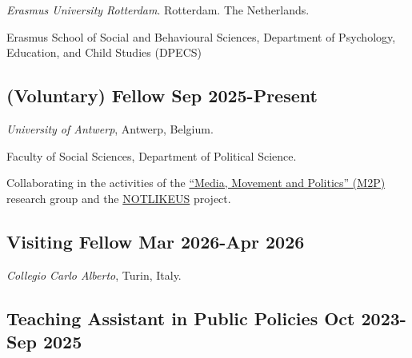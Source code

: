 \documentclass[10pt,]{article}
\providecommand{\tightlist}{%
  \setlength{\itemsep}{0pt}\setlength{\parskip}{0pt}}
\renewenvironment{itemize}{
  \begin{list}{}{
    \setlength{\leftmargin}{1.5em}
  }
}{
  \end{list}
}
\begin{document}
\begin{itemize}
\item
  \emph{Erasmus University Rotterdam}. Rotterdam. The Netherlands.

  \begin{itemize}
  \tightlist
  \item
    Erasmus School of Social and Behavioural Sciences, Department of
    Psychology, Education, and Child Studies (DPECS)
  \end{itemize}
\end{itemize}

\subsection{\texorpdfstring{(Voluntary) Fellow \hfill Sep
2025-Present}{(Voluntary) Fellow Sep 2025-Present}}\label{voluntary-fellow-sep-2025-present}

\begin{itemize}
\tightlist
\item
  \emph{University of Antwerp}, Antwerp, Belgium.
\item
  Faculty of Social Sciences, Department of Political Science.
\item
  Collaborating in the activities of the
  \href{https://www.uantwerpen.be/en/research-groups/m2p/}{``Media,
  Movement and Politics'' (M2P)} research group and the
  \href{https://notlikeus.be/}{NOTLIKEUS} project.
\end{itemize}

\subsection{\texorpdfstring{Visiting Fellow \hfill Mar 2026-Apr
2026}{Visiting Fellow Mar 2026-Apr 2026}}\label{visiting-fellow-mar-2026-apr-2026}

\begin{itemize}
\tightlist
\item
  \emph{Collegio Carlo Alberto}, Turin, Italy.
\end{itemize}

\subsection{\texorpdfstring{Teaching Assistant in Public Policies
\hfill Oct 2023-Sep
2025}{Teaching Assistant in Public Policies Oct 2023-Sep 2025}}\label{teaching-assistant-in-public-policies-oct-2023-sep-2025}
\end{document}
